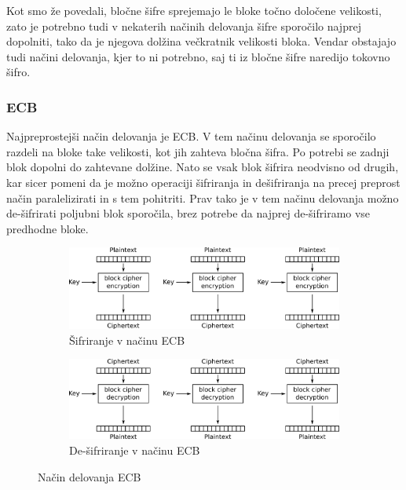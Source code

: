 \documentclass[12pt,a4paper,openany]{book}
\begin{document}
Kot smo že povedali, bločne šifre sprejemajo le bloke točno določene velikosti, zato je potrebno tudi v nekaterih načinih delovanja šifre sporočilo najprej dopolniti, tako da je njegova dolžina večkratnik velikosti bloka. Vendar obstajajo tudi načini delovanja, kjer to ni potrebno, saj ti iz bločne šifre naredijo tokovno šifro.


\subsubsection{ECB}
\label{subs:ECB}

Najpreprostejši način delovanja je \gls{ECB}. V tem načinu delovanja se sporočilo razdeli na bloke take velikosti, kot jih zahteva bločna šifra. Po potrebi se zadnji blok dopolni do zahtevane dolžine. Nato se vsak blok šifrira neodvisno od drugih, kar sicer pomeni da je možno operaciji šifriranja in dešifriranja na precej preprost način paralelizirati in s tem pohitriti. Prav tako je v tem načinu delovanja možno de-šifrirati poljubni blok sporočila, brez potrebe da najprej de-šifriramo vse predhodne bloke.

\begin{figure}[h!]
  \centering
  \begin{subfigure}[b]{\textwidth}
    \includegraphics[width=\textwidth]{images/ECB_encryption}
    \caption{Šifriranje v načinu \gls{ECB}}
\label{fig:ecbenc}
  \end{subfigure}
  \begin{subfigure}[b]{\textwidth}
    \includegraphics[width=\textwidth]{images/ECB_decryption}
    \caption{De-šifriranje v načinu \gls{ECB}}
\label{fig:ecbdec}
  \end{subfigure}
  \caption{Način delovanja \gls{ECB}}
\label{fig:ecbmode}

\end{figure}
\end{document}
